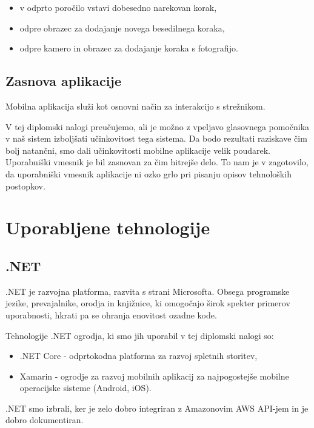 \documentclass[a4paper, 12pt]{book}
\begin{document}
\begin{itemize}
	\item v odprto poročilo vstavi dobesedno narekovan korak,
	\item odpre obrazec za dodajanje novega besedilnega koraka,
	\item odpre kamero in obrazec za dodajanje koraka s fotografijo.
\end{itemize}


\subsection{Zasnova aplikacije}

Mobilna aplikacija služi kot osnovni način za interakcijo s strežnikom.

V tej diplomski nalogi preučujemo, ali je možno z vpeljavo glasovnega pomočnika v naš sistem izboljšati učinkovitost tega sistema.
Da bodo rezultati raziskave čim bolj natančni, smo dali učinkovitosti mobilne aplikacije velik poudarek.
Uporabniški vmesnik je bil zasnovan za čim hitrejše delo.
To nam je v zagotovilo, da uporabniški vmesnik aplikacije ni ozko grlo pri pisanju opisov tehnoloških postopkov.

\section{Uporabljene tehnologije}

\subsection{.NET}

.NET \cite{dotnet} je razvojna platforma, razvita s strani Microsofta.
Obsega programske jezike, prevajalnike, orodja in knjižnice, ki omogočajo širok spekter primerov uporabnosti, hkrati pa se ohranja enovitost ozadne kode.

Tehnologije .NET ogrodja, ki smo jih uporabil v tej diplomski nalogi so:
\begin{itemize}
	\item .NET Core - odprtokodna platforma za razvoj spletnih storitev,
	\item Xamarin - ogrodje za razvoj mobilnih aplikacij za najpogostejše mobilne operacijske sisteme (Android, iOS).
\end{itemize}

.NET smo izbrali, ker je zelo dobro integriran z Amazonovim AWS API-jem in je dobro dokumentiran.
\end{document}
